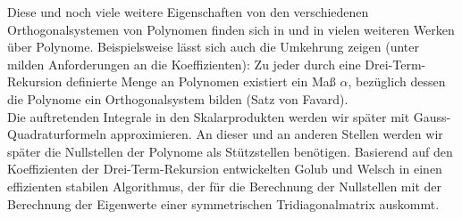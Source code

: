 Diese und noch viele weitere Eigenschaften von den verschiedenen Orthogonalsystemen von Polynomen finden sich in \autocite{weborthopoly} und in vielen weiteren Werken über Polynome. Beispielsweise lässt sich auch die Umkehrung zeigen (unter milden Anforderungen an die Koeffizienten): Zu jeder durch eine Drei-Term-Rekursion definierte Menge an Polynomen existiert ein Maß $\alpha$, bezüglich dessen die Polynome ein Orthogonalsystem bilden (Satz von Favard).\\[0.3cm]
Die auftretenden Integrale in den Skalarprodukten werden wir später mit Gauss-Quadraturformeln approximieren. An dieser und an anderen Stellen werden wir später die Nullstellen der Polynome als Stützstellen benötigen. Basierend auf den Koeffizienten der Drei-Term-Rekursion entwickelten Golub und Welsch in \autocite{GolubWelsch} einen effizienten stabilen Algorithmus, der für die Berechnung der Nullstellen mit der Berechnung der Eigenwerte einer symmetrischen Tridiagonalmatrix auskommt.

